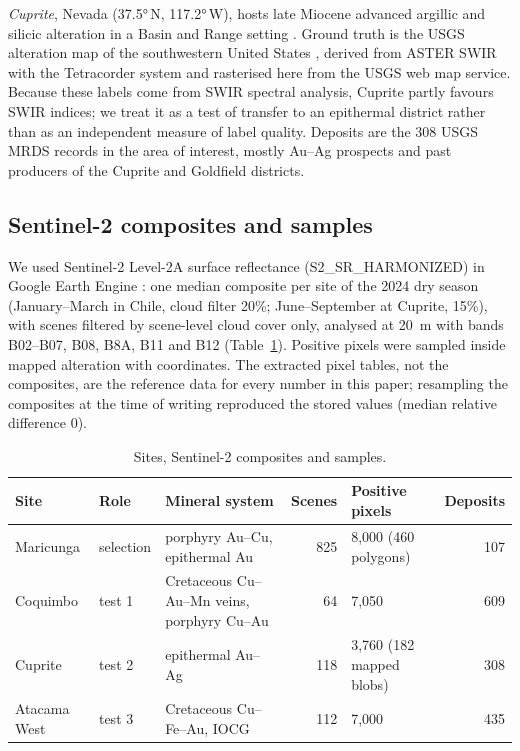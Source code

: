 \documentclass[pdflatex,sn-basic]{sn-jnl}
\begin{document}
\emph{Cuprite}, Nevada (\ang{37.5}\,N, \ang{117.2}\,W), hosts late Miocene advanced argillic and silicic alteration in a Basin and Range setting \citep{Swayze2014}. Ground truth is the USGS alteration map of the southwestern United States \citep{Rockwell2017}, derived from ASTER SWIR with the Tetracorder system and rasterised here from the USGS web map service. Because these labels come from SWIR spectral analysis, Cuprite partly favours SWIR indices; we treat it as a test of transfer to an epithermal district rather than as an independent measure of label quality. Deposits are the 308 USGS MRDS records in the area of interest, mostly Au--Ag prospects and past producers of the Cuprite and Goldfield districts.

\subsection{Sentinel-2 composites and samples}

We used Sentinel-2 Level-2A surface reflectance (S2\_SR\_HARMONIZED) in Google Earth Engine \citep{Gorelick2017}: one median composite per site of the 2024 dry season (January--March in Chile, cloud filter 20\%; June--September at Cuprite, 15\%), with scenes filtered by scene-level cloud cover only, analysed at \SI{20}{\meter} with bands B02--B07, B08, B8A, B11 and B12 (Table~\ref{tab:composites}). Positive pixels were sampled inside mapped alteration with coordinates. The extracted pixel tables, not the composites, are the reference data for every number in this paper; resampling the composites at the time of writing reproduced the stored values (median relative difference 0).

\begin{table}[ht]
\centering
\caption{Sites, Sentinel-2 composites and samples.}
\label{tab:composites}
\small
\footnotesize\setlength{\tabcolsep}{3pt}
\begin{tabular}{llp{3.3cm}rp{2.1cm}r}
\toprule
Site & Role & Mineral system & Scenes & Positive pixels & Deposits \\
\midrule
Maricunga & selection & porphyry Au--Cu, epithermal Au & 825 & 8{,}000 (460 polygons) & 107 \\
Coquimbo & test 1 & Cretaceous Cu--Au--Mn veins, porphyry Cu--Au & 64 & 7{,}050 & 609 \\
Cuprite & test 2 & epithermal Au--Ag & 118 & 3{,}760 (182 mapped blobs) & 308 \\
Atacama West & test 3 & Cretaceous Cu--Fe--Au, IOCG & 112 & 7{,}000 & 435 \\
\bottomrule
\end{tabular}
\end{table}
\end{document}
